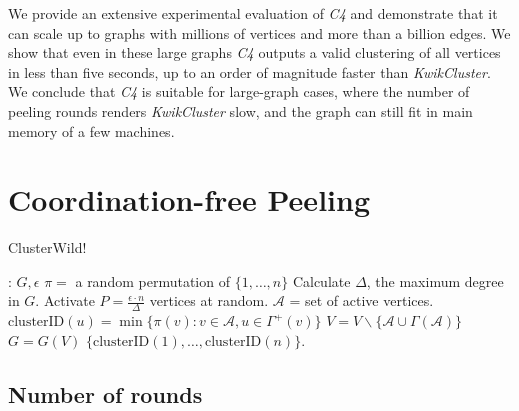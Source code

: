 \documentclass{article} %
\begin{document}
We provide an extensive experimental evaluation of   {\it{C4}} and demonstrate that it can scale up to graphs with millions of vertices and more than a billion edges.
We show that even in these large graphs  {\it{C4}} outputs a valid clustering of all vertices in less than five seconds, up to an order of magnitude faster than {\it{KwikCluster}}.
We conclude that {\it{C4}}  is suitable for large-graph cases, where the number of peeling rounds renders {\it{KwikCluster}} slow, and the graph can still fit in main memory of a few machines.


\section{Coordination-free Peeling}

\begin{algorithm}[H]
   \caption{ClusterWild!}
          \footnotesize{
\begin{algorithmic}[1]
: $G, \epsilon$
\STATE $\pi=$ a random permutation of $\{1,\ldots, n\}$
\STATE Calculate $\Delta$, the maximum degree in $G$.
\STATE Activate $P=\frac{\epsilon\cdot n}{\Delta}$ vertices at random.
\STATE $\mathcal{A}$ = set of active vertices. 
{}
\STATE $\text{clusterID}(u) = \min \{\pi(v): v\in \mathcal{A}, u\in\Gamma^+(v)\}$
\ENDFOR
\STATE $V = V\backslash \{ \mathcal{A}\cup \Gamma( \mathcal{A})\}$
\STATE $G = G(V)$
\ENDWHILE
  $\{\text{clusterID}(1),\ldots, \text{clusterID}(n)\}$.
\end{algorithmic}
}
   \label{alg:rank_d_opt}
 \end{algorithm}




\subsection{Number of rounds}
\end{document}
